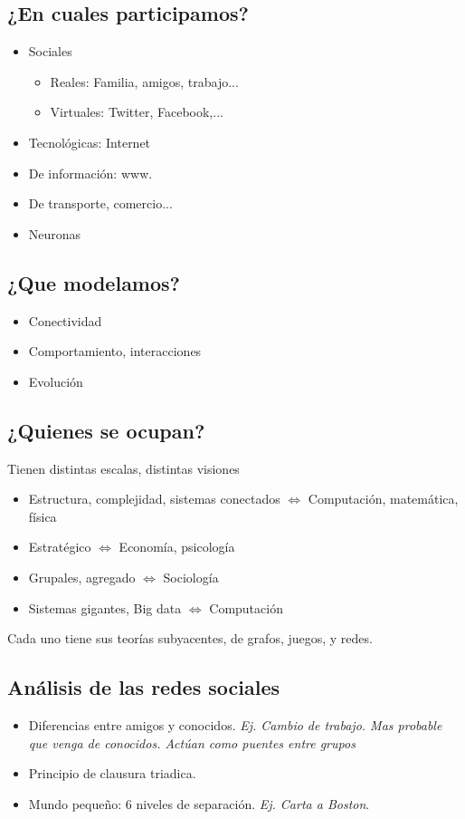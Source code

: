 \documentclass[titlepage,a4paper]{article}
\begin{document}
\subsection{¿En cuales participamos?}
\begin{itemize}
    \item Sociales
    \begin{itemize}
        \item Reales: Familia, amigos, trabajo...
        \item Virtuales: Twitter, Facebook,...
    \end{itemize}
    \item Tecnológicas: Internet
    \item De información: www.
    \item De transporte, comercio...
    \item Neuronas
\end{itemize}

\subsection{¿Que modelamos?}
\begin{itemize}
    \item Conectividad
    \item Comportamiento, interacciones
    \item Evolución
\end{itemize}

\subsection{¿Quienes se ocupan?}
Tienen distintas escalas, distintas visiones
\begin{itemize}
    \item Estructura, complejidad, sistemas conectados $\Longleftrightarrow$ Computación, matemática, física
    \item Estratégico $\Longleftrightarrow$ Economía, psicología
    \item Grupales, agregado $\Longleftrightarrow$ Sociología
    \item Sistemas gigantes, Big data $\Longleftrightarrow$ Computación
\end{itemize}

Cada uno tiene sus teorías subyacentes, de grafos, juegos, y redes.

\subsection{Análisis de las redes sociales}
\begin{itemize}
    \item Diferencias entre amigos y conocidos. \textit{Ej. Cambio de trabajo. Mas probable que venga de conocidos. Actúan como puentes entre grupos}
    \item Principio de clausura triadica.
    \item Mundo pequeño: 6 niveles de separación. \textit{Ej. Carta a Boston}.
\end{itemize}
\end{document}
